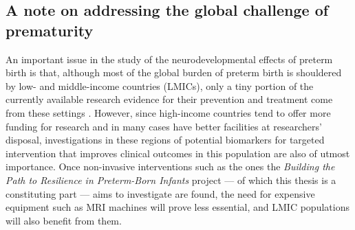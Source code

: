 \subsection*{A note on addressing the global challenge of prematurity} 
An important issue in the study of the neurodevelopmental effects of preterm birth is that, although most of the global burden of preterm birth is shouldered by low- and middle-income countries (LMICs), only a tiny portion of the currently available research evidence for their prevention and treatment come from these settings \citep{Smid2016}. However, since high-income countries tend to offer more funding for research and in many cases have better facilities at researchers' disposal, investigations in these regions of potential biomarkers for targeted intervention that improves clinical outcomes in this population are also of utmost importance. Once non-invasive interventions such as the ones the \textit{Building the Path to Resilience in Preterm-Born Infants} project --- of which this thesis is a constituting part --- aims to investigate are found, the need for expensive equipment such as MRI machines will prove less essential, and LMIC populations will also benefit from them.  


\clearpage